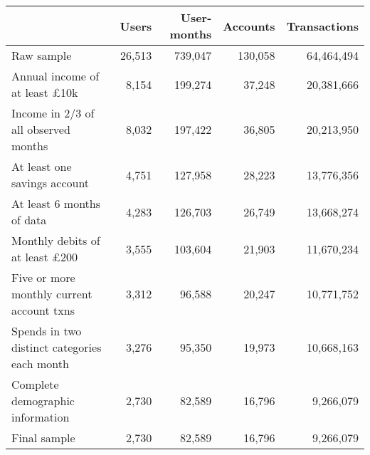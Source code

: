 \begin{tabular}{lrrrr}
\toprule
                                             &  Users & User-months & Accounts & Transactions \\
\midrule
                                  Raw sample & 26,513 &     739,047 &  130,058 &   64,464,494 \\
        Annual income of at least \pounds10k &  8,154 &     199,274 &   37,248 &   20,381,666 \\
        Income in 2/3 of all observed months &  8,032 &     197,422 &   36,805 &   20,213,950 \\
                At least one savings account &  4,751 &     127,958 &   28,223 &   13,776,356 \\
                   At least 6 months of data &  4,283 &     126,703 &   26,749 &   13,668,274 \\
       Monthly debits of at least \pounds200 &  3,555 &     103,604 &   21,903 &   11,670,234 \\
   Five or more monthly current account txns &  3,312 &      96,588 &   20,247 &   10,771,752 \\
Spends in two distinct categories each month &  3,276 &      95,350 &   19,973 &   10,668,163 \\
            Complete demographic information &  2,730 &      82,589 &   16,796 &    9,266,079 \\
                                Final sample &  2,730 &      82,589 &   16,796 &    9,266,079 \\
\bottomrule
\end{tabular}

